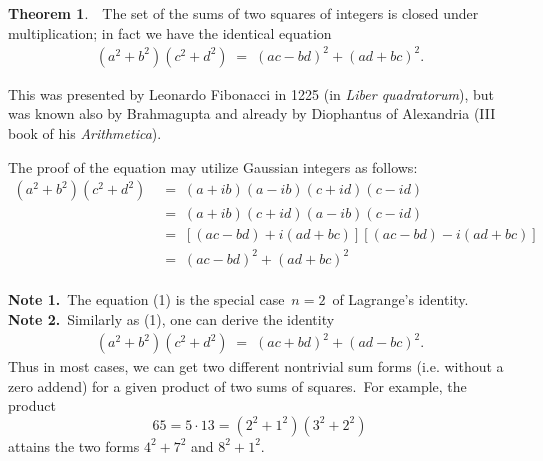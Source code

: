 \documentclass[12pt]{article}
\theoremstyle{definition}
\newtheorem*{thmplain}{Theorem}
\begin{document}
\begin{thmplain}
\,\, The set of the sums of two squares of integers is closed under multiplication; in fact we have the identical equation
\begin{align}
(a^2\!+\!b^2)(c^2\!+\!d^2) \;=\; (ac\!-\!bd)^2\!+\!(ad\!+\!bc)^2.
\end{align}
\end{thmplain}

This was presented by Leonardo Fibonacci in 1225 (in 
\emph{Liber quadratorum}), but was known also by Brahmagupta 
and already by Diophantus of Alexandria (III book of his 
\emph{Arithmetica}).

The proof of the equation may utilize Gaussian integers as follows:
\begin{align*}
   (a^2\!+\!b^2)(c^2\!+\!d^2) &\;=\; 
    (a\!+\!ib)(a\!-\!ib)(c\!+\!id)(c\!-\!id)\\
&\;=\;(a\!+\!ib)(c\!+\!id)(a\!-\!ib)(c\!-\!id)\\
&\;=\;[(ac\!-\!bd)\!+\!i(ad\!+\!bc)][(ac\!-\!bd)\!-\!i(ad\!+\!bc)]\\
&\;=\;(ac\!-\!bd)^2\!+\!(ad\!+\!bc)^2
\end{align*}\\


\textbf{Note 1.}\, The equation (1) is the special case\, $n = 2$\, 
of Lagrange's identity.\\

\textbf{Note 2.}\, Similarly as (1), one can derive the identity
\begin{align}
(a^2\!+\!b^2)(c^2\!+\!d^2) \;=\; (ac\!+\!bd)^2\!+\!(ad\!-\!bc)^2.
\end{align}
Thus in most cases, we can get two different nontrivial sum forms 
(i.e. without a zero addend) for a given product of two sums of 
squares.\, For example, the product
$$65 = 5\!\cdot\!13 = (2^2\!+\!1^2)(3^2\!+\!2^2)$$
attains the two forms  $4^2\!+\!7^2$ and $8^2\!+\!1^2$.


\end{document}
